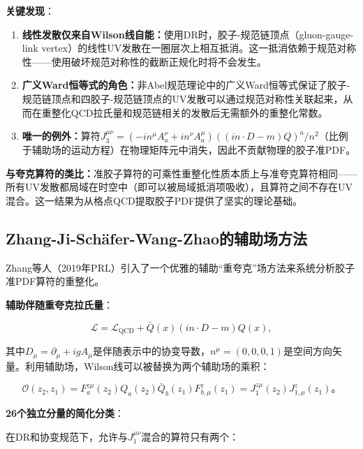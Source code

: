 \documentclass[12pt,a4paper]{ctexart}
\theoremstyle{definition}
\begin{document}
\textbf{关键发现}\cite{Li2018multiplicative}：

\begin{enumerate}
    \item \textbf{线性发散仅来自Wilson线自能：}使用DR时，胶子-规范链顶点（gluon-gauge-link vertex）的线性UV发散在一圈层次上相互抵消。这一抵消依赖于规范对称性——使用破坏规范对称性的截断正规化时将不会发生。
    \item \textbf{广义Ward恒等式的角色：}非Abel规范理论中的广义Ward恒等式保证了胶子-规范链顶点和四胶子-规范链顶点的UV发散可以通过规范对称性关联起来，从而在重整化QCD拉氏量和规范链相关的发散后无需额外的重整化常数。
    \item \textbf{唯一的例外：}算符$J^{\mu\nu}_3 = (-in^\mu A^\nu_a + in^\nu A^\mu_a)((in\cdot D - m)Q)^a/n^2$（比例于辅助场的运动方程）在物理矩阵元中消失，因此不贡献物理的胶子准PDF。
\end{enumerate}

\textbf{与夸克算符的类比：}准胶子算符的可乘性重整化性质本质上与准夸克算符相同\cite{Li2018multiplicative}——所有UV发散都局域在时空中（即可以被局域抵消项吸收），且算符之间不存在UV混合。这一结果为从格点QCD提取胶子PDF提供了坚实的理论基础。

\subsection{Zhang-Ji-Sch\"afer-Wang-Zhao的辅助场方法}

Zhang等人\cite{Zhang2019}（2019年PRL）引入了一个优雅的辅助``重夸克''场方法来系统分析胶子准PDF算符的重整化。

\textbf{辅助伴随重夸克拉氏量}\cite{Zhang2019}：

\begin{equation}
\mathcal{L} = \mathcal{L}_{\text{QCD}} + \bar{Q}(x)(in \cdot D - m)Q(x),
\label{eq:auxiliary_lagrangian}
\end{equation}

其中$D_\mu = \partial_\mu + igA_\mu$是伴随表示中的协变导数，$n^\mu = (0,0,0,1)$是空间方向矢量。利用辅助场，Wilson线可以被替换为两个辅助场的乘积\cite{Zhang2019}：

\begin{equation}
\mathcal{O}(z_2, z_1) = F^{z\mu}_a(z_2) Q_a(z_2) \bar{Q}_b(z_1) F^z_{b,\mu}(z_1) = J^{z\mu}_1(z_2) J^z_{1,\mu}(z_1)。
\label{eq:auxiliary_factorization}
\end{equation}

\textbf{26个独立分量的简化分类}\cite{Zhang2019}：

在DR和协变规范下，允许与$J^{\mu\nu}_1$混合的算符只有两个：
\end{document}
